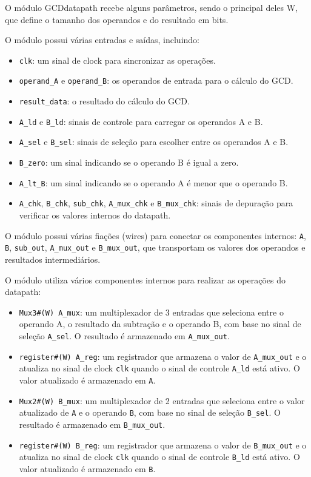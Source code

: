 \documentclass[a4paper,11pt]{article} %
\begin{document}
O módulo GCDdatapath recebe alguns parâmetros,
sendo o principal deles W,
que define o tamanho dos operandos e do resultado em bits.

O módulo possui várias entradas e saídas, incluindo:

\begin{itemize}
    \item \texttt{clk}: um sinal de clock para sincronizar as operações.
    \item \texttt{operand\_A} e \texttt{operand\_B}: os operandos de entrada para o cálculo do GCD.
    \item \texttt{result\_data}: o resultado do cálculo do GCD.
    \item \texttt{A\_ld} e \texttt{B\_ld}: sinais de controle para carregar os operandos A e B.
    \item \texttt{A\_sel} e \texttt{B\_sel}: sinais de seleção para escolher entre os operandos A e B.
    \item \texttt{B\_zero}: um sinal indicando se o operando B é igual a zero.
    \item \texttt{A\_lt\_B}: um sinal indicando se o operando A é menor que o operando B.
    \item \texttt{A\_chk}, \texttt{B\_chk}, \texttt{sub\_chk}, \texttt{A\_mux\_chk} e \texttt{B\_mux\_chk}: sinais de depuração para verificar os valores internos do datapath.
\end{itemize}

O módulo possui várias fiações (wires) para conectar os componentes internos: \texttt{A}, \texttt{B}, \texttt{sub\_out}, \texttt{A\_mux\_out} e \texttt{B\_mux\_out}, que transportam os valores dos operandos e resultados intermediários.

O módulo utiliza vários componentes internos para realizar as operações do datapath:

\begin{itemize}
    \item \texttt{Mux3\#(W) A\_mux}: um multiplexador de 3 entradas que seleciona entre o operando A, o resultado da subtração e o operando B, com base no sinal de seleção \texttt{A\_sel}. O resultado é armazenado em \texttt{A\_mux\_out}.
    \item \texttt{register\#(W) A\_reg}: um registrador que armazena o valor de \texttt{A\_mux\_out} e o atualiza no sinal de clock \texttt{clk} quando o sinal de controle \texttt{A\_ld} está ativo. O valor atualizado é armazenado em \texttt{A}.
    \item \texttt{Mux2\#(W) B\_mux}: um multiplexador de 2 entradas que seleciona entre o valor atualizado de \texttt{A} e o operando \texttt{B}, com base no sinal de seleção \texttt{B\_sel}. O resultado é armazenado em \texttt{B\_mux\_out}.
    \item \texttt{register\#(W) B\_reg}: um registrador que armazena o valor de \texttt{B\_mux\_out} e o atualiza no sinal de clock \texttt{clk} quando o sinal de controle \texttt{B\_ld} está ativo. O valor atualizado é armazenado em \texttt{B}.
\end{itemize}
\end{document}
